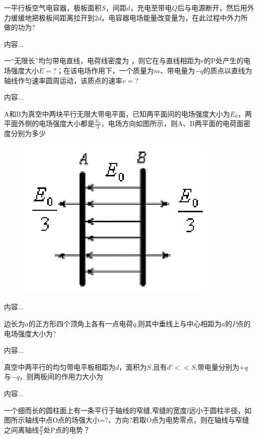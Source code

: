 \documentclass[lang=cn,10pt]{elegantbook}
\begin{document}
		\begin{exercise}
			一平行板空气电容器，极板面积$S$，间距$d$，充电至带电$Q$后与电源断开，然后用外力缓缓地把极板间距离拉开到$2d$。电容器电场能量改变量为，在此过程中外力所做的功为?
		\end{exercise}
		\begin{solution}
			内容...
		\end{solution}
		\begin{exercise}
			一“无限长”均匀带电直线，电荷线密度为 ，则它在与直线相距为$r$的P处产生的电场强度大小$E=?$；在该电场作用下，一个质量为$m$、带电量为$-q$的质点以直线为轴线作匀速率圆周运动，该质点的速率$v =$?
		\end{exercise}
		\begin{solution}
			内容...
		\end{solution}
		\begin{exercise}
			A和B为真空中两块平行无限大带电平面，已知两平面间的电场强度大小为$E_{0}$，两平面外侧的电场强度大小都是$\frac{E_{0}}{3}$，电场方向如图所示，则A、B两平面的电荷面密度分别为多少			
\begin{figure}[H]
	\centering
	\includegraphics[width=0.1\linewidth]{image/图片9}
	\caption{}
	\label{fig:9}
\end{figure}
		\end{exercise}
		\begin{solution}
			内容...
		\end{solution}
		\begin{exercise}
			边长为$a$的正方形四个顶角上各有一点电荷$q$,则其中垂线上与中心相距为$a$的$P$点的电场强度大小为?
		\end{exercise}
		\begin{solution}
			内容...
		\end{solution}
		\begin{exercise}
		真空中两平行的均匀带电平板相距为$d$，面积为$S$,且有$d'<<S$,带电量分别为$+q$与$-q$，则两板间的作用力大小为
		\end{exercise}
		\begin{solution}
			内容...
		\end{solution}
		\begin{exercise}
			一个细而长的圆柱面上有一条平行于轴线的窄缝,窄缝的宽度$l$远小于圆柱半径，如图所示轴线中点О点的场强大小=?、方向?若取O点为电势零点，则在轴线与窄缝之间离轴线$\frac{R}{3}$处P点的电势？
		\end{exercise}
\end{document}
